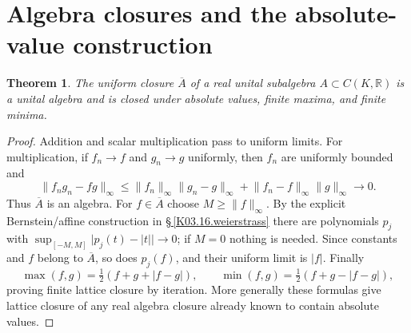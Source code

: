 \documentclass[11pt,oneside,a4paper]{book}
\newtheorem{theorem}{Theorem}[chapter]
\theoremstyle{definition}
\theoremstyle{remark}
\newcommand{\R}{\mathbb R}
\newcommand{\abs}[1]{\lvert#1\rvert}
\newcommand{\norm}[1]{\lVert#1\rVert}
\newcommand{\KEntry}[2]{\Needspace{7\baselineskip}\section{#2}\label{#1}{\small\sffamily\color{black!60}\detokenize{#1}}\par}
\newcommand{\KRef}[1]{\hyperref[#1]{\S\,\ref*{#1}}}
\begin{document}
\KEntry{K03.16.lattice}{Algebra closures and the absolute-value construction}
\begin{theorem}
The uniform closure $\overline A$ of a real unital subalgebra $A\subset C(K,\R)$ is a unital algebra and is closed under absolute values, finite maxima, and finite minima.
\end{theorem}
\begin{proof}
Addition and scalar multiplication pass to uniform limits. For multiplication, if $f_n\to f$ and $g_n\to g$ uniformly, then $f_n$ are uniformly bounded and
\[\norm{f_ng_n-fg}_\infty\leq\norm{f_n}_\infty\norm{g_n-g}_\infty+\norm{f_n-f}_\infty\norm g_\infty\longrightarrow0.\]
Thus $\overline A$ is an algebra. For $f\in\overline A$ choose $M\geq\norm f_\infty$. By the explicit Bernstein/affine construction in \KRef{K03.16.weierstrass} there are polynomials $p_j$ with $\sup_{[-M,M]}\abs{p_j(t)-\abs t}\to0$; if $M=0$ nothing is needed. Since constants and $f$ belong to $\overline A$, so does $p_j(f)$, and their uniform limit is $\abs f$. Finally
\[\max(f,g)=\tfrac12(f+g+\abs{f-g}),\qquad\min(f,g)=\tfrac12(f+g-\abs{f-g}),\]
proving finite lattice closure by iteration. More generally these formulas give lattice closure of any real algebra closure already known to contain absolute values.
\end{proof}
\end{document}
